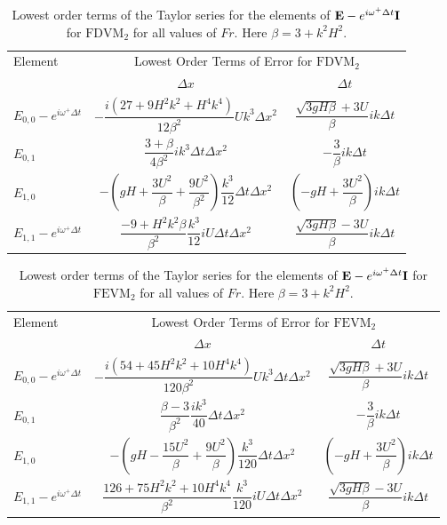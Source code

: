 \begin{table}
	\begin{tabular}{l c c}
	\hline
		Element & \multicolumn{2}{c}{Lowest Order Terms of Error for $\text{FDVM}_2$}\T \B  \\
		  \cline{2-3}
		& $\Delta x$&$\Delta t$\T \B  \\
		\hline
		$E_{0,0} -  e^{i \omega^+ \Delta t} $& $ -\dfrac{i \left(27 + 9H^2k^2 + H^4k^4\right)}{12\beta^2} U k^3 \Delta x^2$ & $\dfrac{\sqrt{3gH \beta} + 3U}{\beta} ik \Delta t$ \T \B  \\
		$E_{0,1}$& $ \dfrac{3 + \beta}{4 \beta^2}i k^3\Delta  t\Delta x^2$ &  $ - \dfrac{3}{\beta} ik\Delta t$ \T \B \\
		$E_{1,0}$& $ -\left(gH + \dfrac{3U^2}{\beta} + \dfrac{9U^2}{\beta^2}\right)  \dfrac{k^3}{12}\Delta t\Delta x^2$ &  $ \left(-gH + \dfrac{3U^2}{\beta}\right)ik \Delta t$ \T \B  \\
		$E_{1,1} -  e^{i \omega^+ \Delta t}$& $ \dfrac{-9 + H^2k^2\beta}{\beta^2} \dfrac{k^3}{12} i U \Delta t\Delta x^2$ & $\dfrac{\sqrt{3gH \beta} - 3U}{\beta} ik \Delta t$ \T \B  \\
		\hline 
	\end{tabular}
	\caption{Lowest order terms of the Taylor series for the elements of $\mathbf{E} - e^{i \omega^+ \Delta t} \mathbf{I}$ for $\text{FDVM}_2$ for all values of $Fr$. Here $\beta = 3 + k^2 H^2$.}
	\label{tab:EerrFDVM2} 
\end{table}
\begin{table}
	\begin{tabular}{l c c}
		\hline 
		Element & \multicolumn{2}{c}{Lowest Order Terms of Error for $\text{FEVM}_2$}\T \B  \\
		  \cline{2-3}
		& $\Delta x$&$\Delta t$\T \B  \\
		\hline
		$E_{0,0} -  e^{i \omega^+ \Delta t} $& $ -\dfrac{i \left(54 + 45H^2k^2 + 10H^4k^4\right)}{120\beta^2} U k^3 \Delta t \Delta x^2$ & $\dfrac{\sqrt{3gH \beta} + 3U}{\beta} ik \Delta t$ \T \B  \\
		$E_{0,1}$& $ \dfrac{\beta - 3}{\beta^2} \dfrac{ik^3}{40} \Delta  t\Delta x^2$ &  $ - \dfrac{3}{\beta} ik\Delta t$ \T \B  \\
		$E_{1,0}$& $ -\left(gH - \dfrac{15U^2}{\beta} + \dfrac{9U^2}{\beta}\right)  \dfrac{k^3}{120}\Delta t\Delta x^2$ &  $ \left(-gH + \dfrac{3U^2}{\beta}\right)ik \Delta t$ \T \B  \\
		$E_{1,1} -  e^{i \omega^+ \Delta t}$& $ \dfrac{126 + 75H^2 k^2 + 10 H^4 k^4}{\beta^2} \dfrac{k^3}{120} i U \Delta t\Delta x^2$ & $\dfrac{\sqrt{3gH \beta} - 3U}{\beta} ik \Delta t$ \T \B  \\\hline
	\end{tabular}
	\caption{Lowest order terms of the Taylor series for the elements of $\mathbf{E} - e^{i \omega^+ \Delta t} \mathbf{I}$ for $\text{FEVM}_2$ for all values of $Fr$. Here $\beta = 3 + k^2 H^2$.}
	\label{tab:EerrFEVM2} 
\end{table}
